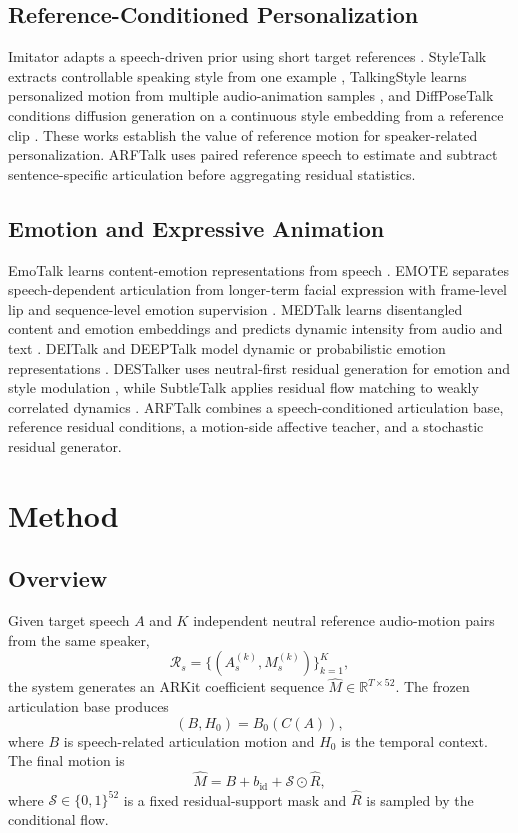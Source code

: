 \documentclass[conference]{IEEEtran}
\begin{document}
\subsection{Reference-Conditioned Personalization}
Imitator adapts a speech-driven prior using short target references \cite{imitator}. StyleTalk extracts controllable speaking style from one example \cite{styletalk}, TalkingStyle learns personalized motion from multiple audio-animation samples \cite{talkingstyle}, and DiffPoseTalk conditions diffusion generation on a continuous style embedding from a reference clip \cite{diffposetalk}. These works establish the value of reference motion for speaker-related personalization. ARFTalk uses paired reference speech to estimate and subtract sentence-specific articulation before aggregating residual statistics.
\subsection{Emotion and Expressive Animation}
EmoTalk learns content-emotion representations from speech \cite{emotalk}. EMOTE separates speech-dependent articulation from longer-term facial expression with frame-level lip and sequence-level emotion supervision \cite{emote}. MEDTalk learns disentangled content and emotion embeddings and predicts dynamic intensity from audio and text \cite{medtalk}. DEITalk and DEEPTalk model dynamic or probabilistic emotion representations \cite{deitalk,deeptalk}. DESTalker uses neutral-first residual generation for emotion and style modulation \cite{destalker}, while SubtleTalk applies residual flow matching to weakly correlated dynamics \cite{subtletalk}. ARFTalk combines a speech-conditioned articulation base, reference residual conditions, a motion-side affective teacher, and a stochastic residual generator.
\section{Method}
\subsection{Overview}
Given target speech $A$ and $K$ independent neutral reference audio-motion pairs from the same speaker,
\begin{equation}
\mathcal{R}_s=\{(A_s^{(k)},M_s^{(k)})\}_{k=1}^{K},
\end{equation}
the system generates an ARKit coefficient sequence $\hat M\in\mathbb{R}^{T\times52}$. The frozen articulation base produces
\begin{equation}
(B,H_0)=B_0(C(A)),
\end{equation}
where $B$ is speech-related articulation motion and $H_0$ is the temporal context. The final motion is
\begin{equation}
\hat M=B+b_{\mathrm{id}}+\mathcal{S}\odot\hat R,
\end{equation}
where $\mathcal{S}\in\{0,1\}^{52}$ is a fixed residual-support mask and $\hat R$ is sampled by the conditional flow.
\end{document}
